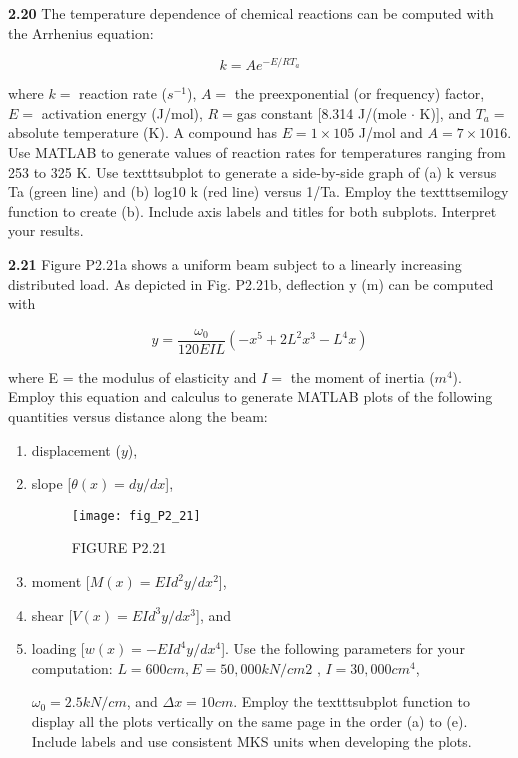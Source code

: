 \documentclass[../main.tex]{subfiles}
\begin{document}
\begin{multicols}{2}
\textbf{2.20} The temperature dependence of chemical reactions can
be computed with the Arrhenius equation:

$$k=Ae^{-E/RT_a}$$

where $k =$ reaction rate ($s^{-1}$), $A =$ the preexponential (or frequency) factor, 
$E =$ activation energy (J/mol), $R = $gas constant [8.314 J/(mole $\cdot$  K)], and $T_a =$ absolute temperature
(K). A compound has $E = 1 \times  105$ J/mol and $A = 7 \times 1016$.
Use MATLAB to generate values of reaction rates for
temperatures ranging from 253 to 325 K. Use texttt{subplot} to
generate a side-by-side graph of (a) k versus Ta (green line)
and (b) log10 k (red line) versus 1/Ta. Employ the texttt{semilogy}
function to create (b). Include axis labels and titles for both
subplots. Interpret your results.


\textbf{2.21} Figure P2.21a shows a uniform beam subject to a linearly increasing distributed load. As depicted in Fig. P2.21b,
deflection y (m) can be computed with

$$y=\dfrac{\omega_0}{120EIL}(-x^5+2L^2x^3-L^4x)$$

where E = the modulus of elasticity and $I =$ the moment of
inertia ($m^4$). Employ this equation and calculus to generate
MATLAB plots of the following quantities versus distance
along the beam:

\begin{enumerate}[label=(\alph*)]
	\item displacement ($y$), 
	\item slope [$\theta(x) = dy/dx$], 


\begin{figure}[H]
	\centering
	\texttt{[image: fig\_P2\_21]}
   \caption*{\textsf{FIGURE P2.21}}
   \label{fig_P2_6}
\end{figure}
\item moment [$M(x) = EId^2 y/dx^2$],
\item shear [$V(x) = EId^3 y/dx^3$], and

\item loading [$w(x) = -EId^4 y/dx^4$].
Use the following parameters for your computation:
$L = 600 cm, E = 50,000 kN/cm2$ , $I = 30,000 cm^4$,

$\omega_0 = 2.5 kN/cm$, and $\Delta x = 10 cm$. Employ the texttt{subplot}
function to display all the plots vertically on the same page
in the order (a) to (e). Include labels and use consistent MKS
units when developing the plots.
\end{enumerate}


\end{multicols}
\end{document}
